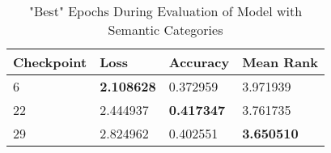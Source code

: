 \begin{table}[h!]
\centering
\caption{"Best" Epochs During Evaluation of Model with Semantic Categories}
\begin{tabular}{l | l | l | l}
Checkpoint & Loss & Accuracy & Mean Rank \\
\hline
6 & \textbf{2.108628} & 0.372959 & 3.971939 \\
22 & 2.444937 & \textbf{0.417347} & 3.761735 \\
29 & 2.824962 & 0.402551 & \textbf{3.650510} 
\end{tabular}
\label{tab:best_category}
\end{table}


